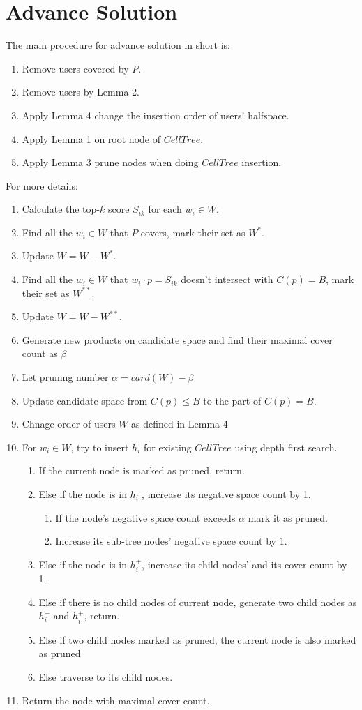 \section{Advance Solution}
The main procedure for advance solution in short is:
\begin{enumerate}
  \item Remove users covered by $P$.
  \item Remove users by Lemma 2.
  \item Apply Lemma 4 change the insertion order of users' halfspace.
  \item Apply Lemma 1 on root node of $CellTree$.
  \item Apply Lemma 3 prune nodes when doing $CellTree$ insertion.
\end{enumerate}
For more details:
\begin{enumerate}
\item Calculate the top-$k$ score $S_{ik}$ for each $w_i\in W$.
\item Find all the $w_i\in W$ that $P$ covers, mark their set as $W^*$.
\item Update $W=W-W^*$.
\item Find all the $w_i\in W$ that $w_i\cdot p=S_{ik}$ doesn't intersect with $C(p)=B$, mark their set as $W^{**}$.
\item Update $W=W-W^{**}$.
\item Generate new products on candidate space and find their maximal cover count as $\beta$
\item Let pruning number $\alpha =card(W)-\beta $
\item Update candidate space from $C(p) \leq B$ to the part of $C(p)=B$.
\item Chnage order of users $W$ as defined in Lemma 4
\item For $w_i \in W$,
try to insert $h_i$ for existing $CellTree$ using depth first search.
\begin{enumerate}
\item If the current node is marked as pruned, return.
\item Else if the node is in $h_i^-$, increase its negative space count by 1.
\begin{enumerate}
  \item If the node's negative space count exceeds $\alpha$ mark it as pruned.
  \item Increase its sub-tree nodes' negative space count by 1.
\end{enumerate} 
\item Else if the node is in $h_i^+$, increase its child nodes' and its cover count by 1.
\item Else if there is no child nodes of current node, generate two child nodes as 
      $h_i^-$ and $h_i^+$, return. 
\item Else if two child nodes marked as pruned, the current node is also marked as pruned
\item Else traverse to its child nodes.
\end{enumerate}
\item Return the node with maximal cover count.
\end{enumerate}

